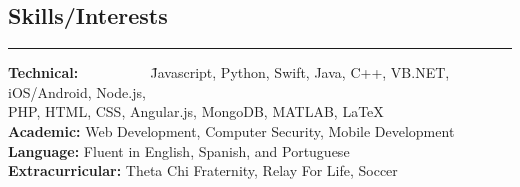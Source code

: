 \documentclass{res}
\begin{document}
\begin{resume}
\vspace{-9pt}

\section{{\large Skills/Interests}}

\vspace{-10pt}

\noindent\rule{\resumewidth}{0.4pt}  
\vspace{-30pt}
\begin{tabbing}
 {\bf Technical: } ~~~~~~~~~ \= Javascript, Python, Swift, Java, C++, VB.NET, iOS/Android, Node.js,\\
\> PHP, HTML, CSS, Angular.js, MongoDB, MATLAB, \LaTeX \\
{\bf Academic: } \>  Web Development, Computer Security, Mobile Development \\
{\bf Language: } \> Fluent in English, Spanish, and Portuguese\\
{\bf Extracurricular: } \> Theta Chi Fraternity, Relay For Life, Soccer \\
\end{tabbing}

\end{resume} 
\end{document}
